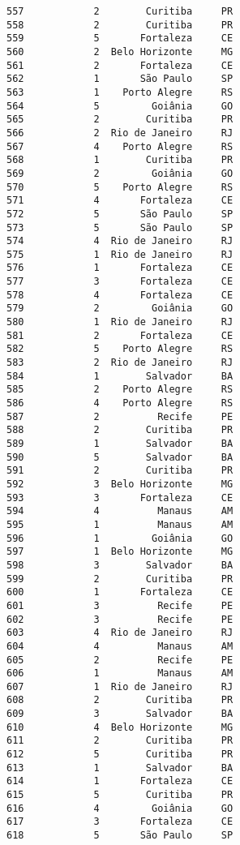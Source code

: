 \documentclass[11pt]{article}
\begin{document}
\begin{Verbatim}[commandchars=\\\{\}]
557            2        Curitiba     PR  
558            2        Curitiba     PR  
559            5       Fortaleza     CE  
560            2  Belo Horizonte     MG  
561            2       Fortaleza     CE  
562            1       São Paulo     SP  
563            1    Porto Alegre     RS  
564            5         Goiânia     GO  
565            2        Curitiba     PR  
566            2  Rio de Janeiro     RJ  
567            4    Porto Alegre     RS  
568            1        Curitiba     PR  
569            2         Goiânia     GO  
570            5    Porto Alegre     RS  
571            4       Fortaleza     CE  
572            5       São Paulo     SP  
573            5       São Paulo     SP  
574            4  Rio de Janeiro     RJ  
575            1  Rio de Janeiro     RJ  
576            1       Fortaleza     CE  
577            3       Fortaleza     CE  
578            4       Fortaleza     CE  
579            2         Goiânia     GO  
580            1  Rio de Janeiro     RJ  
581            2       Fortaleza     CE  
582            5    Porto Alegre     RS  
583            2  Rio de Janeiro     RJ  
584            1        Salvador     BA  
585            2    Porto Alegre     RS  
586            4    Porto Alegre     RS  
587            2          Recife     PE  
588            2        Curitiba     PR  
589            1        Salvador     BA  
590            5        Salvador     BA  
591            2        Curitiba     PR  
592            3  Belo Horizonte     MG  
593            3       Fortaleza     CE  
594            4          Manaus     AM  
595            1          Manaus     AM  
596            1         Goiânia     GO  
597            1  Belo Horizonte     MG  
598            3        Salvador     BA  
599            2        Curitiba     PR  
600            1       Fortaleza     CE  
601            3          Recife     PE  
602            3          Recife     PE  
603            4  Rio de Janeiro     RJ  
604            4          Manaus     AM  
605            2          Recife     PE  
606            1          Manaus     AM  
607            1  Rio de Janeiro     RJ  
608            2        Curitiba     PR  
609            3        Salvador     BA  
610            4  Belo Horizonte     MG  
611            2        Curitiba     PR  
612            5        Curitiba     PR  
613            1        Salvador     BA  
614            1       Fortaleza     CE  
615            5        Curitiba     PR  
616            4         Goiânia     GO  
617            3       Fortaleza     CE  
618            5       São Paulo     SP  

\end{Verbatim}
\end{document}
